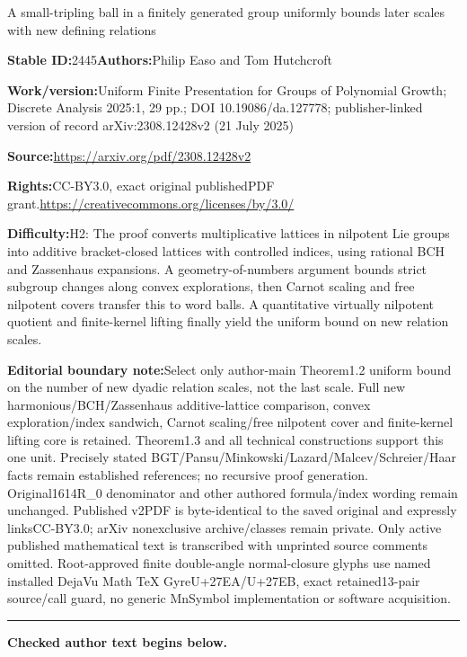 \documentclass[11pt]{article}
\numberwithin{equation}{section}
\theoremstyle{plain}
\theoremstyle{definition}
\theoremstyle{remark}
\numberwithin{equation}{section}
\numberwithin{equation}{section}
\begin{document}
\begin{center}\Large A small-tripling ball in a finitely generated group uniformly bounds later scales with new defining relations\end{center}\noindent\textbf{Stable ID:}2445\quad\textbf{Authors:}Philip Easo and Tom Hutchcroft\par\noindent\textbf{Work/version:}Uniform Finite Presentation for Groups of Polynomial Growth; Discrete Analysis 2025:1, 29 pp.; DOI 10.19086/da.127778; publisher-linked version of record arXiv:2308.12428v2 (21 July 2025)\par\noindent\textbf{Source:}\url{https://arxiv.org/pdf/2308.12428v2}\par\noindent\textbf{Rights:}CC-BY3.0, exact original publishedPDF grant.\url{https://creativecommons.org/licenses/by/3.0/}\par\noindent\textbf{Difficulty:}H2: The proof converts multiplicative lattices in nilpotent Lie groups into additive bracket-closed lattices with controlled indices, using rational BCH and Zassenhaus expansions. A geometry-of-numbers argument bounds strict subgroup changes along convex explorations, then Carnot scaling and free nilpotent covers transfer this to word balls. A quantitative virtually nilpotent quotient and finite-kernel lifting finally yield the uniform bound on new relation scales.\par\medskip\noindent\textbf{Editorial boundary note:}Select only author-main Theorem1.2 uniform bound on the number of new dyadic relation scales, not the last scale. Full new harmonious/BCH/Zassenhaus additive-lattice comparison, convex exploration/index sandwich, Carnot scaling/free nilpotent cover and finite-kernel lifting core is retained. Theorem1.3 and all technical constructions support this one unit. Precisely stated BGT/Pansu/Minkowski/Lazard/Malcev/Schreier/Haar facts remain established references; no recursive proof generation. Original1614R\_0 denominator and other authored formula/index wording remain unchanged. Published v2PDF is byte-identical to the saved original and expressly linksCC-BY3.0; arXiv nonexclusive archive/classes remain private. Only active published mathematical text is transcribed with unprinted source comments omitted. Root-approved finite double-angle normal-closure glyphs use named installed DejaVu Math TeX GyreU+27EA/U+27EB, exact retained13-pair source/call guard, no generic MnSymbol implementation or software acquisition.\par\medskip\hrule\medskip\noindent\textbf{Checked author text begins below.}\par
\end{document}
